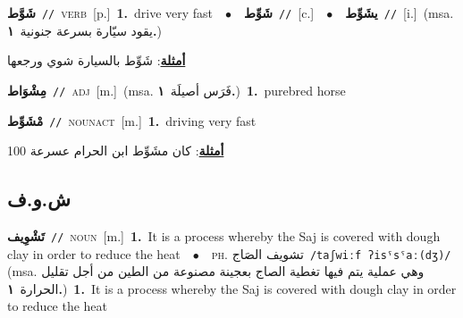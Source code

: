 \documentclass[10pt,a4paper,twoside]{article} %
\begin{document}
\begin{multicols}{2}
{\setlength\topsep{0pt}\textbf{\foreignlanguage{arabic}{شَوَّط}}\ {\color{gray}\texttt{//}\color{black}}\ \textsc{verb}\ [p.]\ \textbf{1.}~drive very fast\ \ $\bullet$\ \ \setlength\topsep{0pt}\textbf{\foreignlanguage{arabic}{شَوِّط}}\ {\color{gray}\texttt{//}\color{black}}\ [c.]\ \ $\bullet$\ \ \setlength\topsep{0pt}\textbf{\foreignlanguage{arabic}{يشَوِّط}}\ {\color{gray}\texttt{//}\color{black}}\ [i.]\ \color{gray}(msa. \foreignlanguage{arabic}{يقود سيّارة بسرعة جنونية}~\foreignlanguage{arabic}{\textbf{١.}})\color{black}\  \begin{flushright}\color{gray}\foreignlanguage{arabic}{\textbf{\underline{\foreignlanguage{arabic}{أمثلة}}}: شَوِّط بالسيارة شوي ورجعها}\end{flushright}\color{black}} \vspace{2mm}

{\setlength\topsep{0pt}\textbf{\foreignlanguage{arabic}{مِشْوَاط}}\ {\color{gray}\texttt{//}\color{black}}\ \textsc{adj}\ [m.]\ \color{gray}(msa. \foreignlanguage{arabic}{فَرَس أصيلَة}~\foreignlanguage{arabic}{\textbf{١.}})\color{black}\ \textbf{1.}~purebred horse\ } \vspace{2mm}

{\setlength\topsep{0pt}\textbf{\foreignlanguage{arabic}{مْشَوِّط}}\ {\color{gray}\texttt{//}\color{black}}\ \textsc{noun\textunderscore act}\ [m.]\ \textbf{1.}~driving very fast\  \begin{flushright}\color{gray}\foreignlanguage{arabic}{\textbf{\underline{\foreignlanguage{arabic}{أمثلة}}}: كان مشَوِّط ابن الحرام عسرعة 100}\end{flushright}\color{black}} \vspace{2mm}

\vspace{-3mm}
\subsection*{\color{blue}\foreignlanguage{arabic}{ش.و.ف}\color{blue}{}} 

{\setlength\topsep{0pt}\textbf{\foreignlanguage{arabic}{تَشْوِيف}}\ {\color{gray}\texttt{//}\color{black}}\ \textsc{noun}\ [m.]\ \textbf{1.}~It is a process whereby the Saj is covered with dough clay in order to reduce the heat\ \ $\bullet$\ \ \textsc{ph.} \color{gray} \foreignlanguage{arabic}{تشويف الصَاج}\color{black}\ {\color{gray}\texttt{/{\sffamily taʃwiːf ʔisˤsˤaː(dʒ)}/}\color{black}}\ \color{gray} (msa. \foreignlanguage{arabic}{وهي عملية يتم فيها تغطية الصاج بعجينة مصنوعة من الطين من أجل تقليل الحرارة}~\foreignlanguage{arabic}{\textbf{١.}})\color{black}\ \textbf{1.}~It is a process whereby the Saj is covered with dough clay in order to reduce the heat\ } \vspace{2mm}


\end{multicols}
\end{document}
